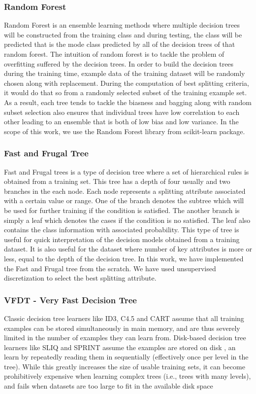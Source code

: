\documentclass[sigplan]{acmart}\settopmatter{printfolios=true,printccs=false,printacmref=false}
\begin{document}
\subsubsection{Random Forest}
Random Forest is an ensemble learning methods where multiple decision trees will be constructed from the training class and during testing, the class will be predicted that is the mode class predicted by all of the decision trees of that random forest. The intuition of random forest is to tackle the problem of overfitting suffered by the decision trees. In order to build the decision trees during the training time, example data of the training dataset will be randomly chosen along with replacement. During the computation of best splitting criteria, it would do that so from a randomly selected subset of the training example set. As a result, each tree tends to tackle the biasness and bagging along with random subset selection also ensures that individual trees have low correlation to each other leading to an ensemble that is both of low bias and low variance. In the scope of this work, we use the Random Forest library from scikit-learn package.

\subsubsection{Fast and Frugal Tree}
Fast and Frugal trees is a type of decision tree where a set of hierarchical rules is obtained from a training set. This tree has a depth of four usually and two branches in the each node. Each node represents a splitting attribute associated with a certain value or range. One of the branch denotes the subtree which will be used for further training if the condition is satisfied. The another branch is simply a leaf which denotes the cases if the condition is no satisfied. The leaf also contains the class information with associated probability. This type of tree is useful for quick interpretation of the decision models obtained from a training dataset. It is also useful for the dataset where number of key attributes is more or less, equal to the depth of the decision tree. In this work, we have implemented the Fast and Frugal tree from the scratch. We have used unsupervised discretization to select the best splitting attribute. 

\subsubsection{VFDT - Very Fast Decision Tree}
Classic decision tree learners like ID3, C4.5 and CART assume that all training examples can be stored simultaneously in main memory, and are thus
severely limited in the number of examples they can learn from. Disk-based decision tree learners like SLIQ and SPRINT assume the examples are stored on disk \cite{mehta1996sliq, quinlan1995oversearching}, an 
learn by repeatedly reading them in sequentially (effectively once per level in the tree). While this greatly increases the
size of usable training sets, it can become prohibitively expensive when learning complex trees (i.e., trees with many levels), and fails when datasets are too large to fit in the
available disk space
\end{document}
